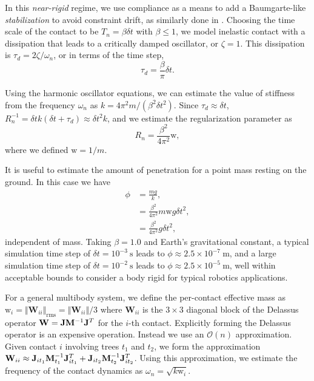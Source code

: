 In this \emph{near-rigid} regime, we use compliance as a means to add a
Baumgarte-like \emph{stabilization} to avoid constraint drift, as similarly done
in \cite{bib:todorov2011}. Choosing the time scale of the contact to be $T_n =
\beta \delta t$ with $\beta \le 1$, we model inelastic contact with a
dissipation that leads to a critically damped oscillator, or $\zeta=1$. This
dissipation is $\tau_d=2\zeta/\omega_n$, or in terms of the time step,
\begin{equation*}
    \tau_d=\frac{\beta}{\pi}\delta t.
\end{equation*}

Using the harmonic oscillator equations, we can estimate the value of stiffness
from the frequency $\omega_n$ as $k=4\pi^2 m/(\beta^2 \delta t^2)$. Since
$\tau_d\approx\delta t$, $R_n^{-1} = \delta t k(\delta t+\tau_d) \approx \delta
t^2k$, and we estimate the regularization parameter as
\begin{equation*}
	R_n = \frac{\beta^2}{4\pi^2}\text{w},
\end{equation*}
where we defined $\text{w}=1/m$.

It is useful to estimate the amount of penetration for a point mass resting on
the ground. In this case we have
\begin{align*}
	\phi &= \frac{mg}{k}, \\
	&= \frac{\beta^2}{4\pi^2}m\text{w}g\delta t^2,\\
	&= \frac{\beta^2}{4\pi^2}g\delta t^2,
\end{align*}
independent of mass. Taking $\beta=1.0$ and Earth's gravitational constant, a
typical simulation time step of $\delta t=10^{-3}~\text{s}$ leads to
$\phi\approx 2.5\times 10^{-7}~\text{m}$, and a large simulation time step of
$\delta t=10^{-2}~\text{s}$ leads to $\phi\approx 2.5\times 10^{-5}~\text{m}$,
well within acceptable bounds to consider a body rigid for typical robotics
applications.

For a general multibody system, we define the per-contact effective mass as
$\text{w}_i=\Vert\mathbf{W}_{ii}\Vert_\text{rms}=\Vert\mathbf{W}_{ii}\Vert/3$
where $\mathbf{W}_{ii}$ is the $3\times 3$ diagonal block of the Delassus
operator $\mathbf{W}={\mathbf{J}}{\mathbf{M}}^{-1}{\mathbf{J}}^T$ for the $i$-th contact.
Explicitly forming the Delassus operator is an expensive operation. Instead we
use an $\mathcal{O}(n)$ approximation. Given contact $i$ involving trees $t_1$
and $t_2$, we form the approximation $\mathbf{W}_{ii}\approx{\mathbf{J}}_{i
t_1}{\mathbf{M}}_{t_1}^{-1}{\mathbf{J}}_{i t_1}^T+{\mathbf{J}}_{i t_2}{\mathbf{M}}_{t_2}^{-1}{\mathbf{J}}_{i
t_2}^T$. Using this approximation, we estimate the frequency of the contact
dynamics as $\omega_n=\sqrt{k\text{w}_i}$.

